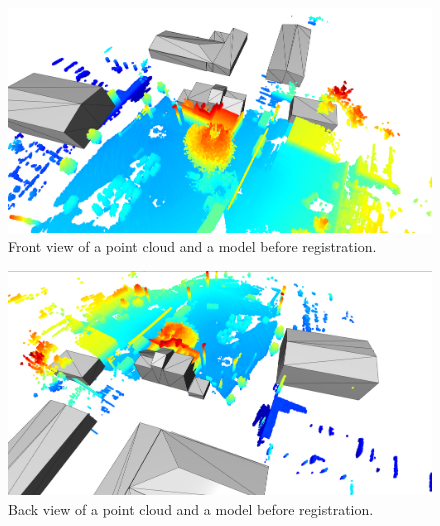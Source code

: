         \begin{figure}[H]
            \centering
            \includegraphics[scale=0.2]{images/solution_images/initial_front_model.png}
            \caption{Front view of a point cloud and a model before registration.}
            \label{fig:initial_front_model}
        \end{figure}
      
        \begin{figure}[H]
            \centering
            \includegraphics[scale=0.2]{images/solution_images/initial_back_model.png}
            \caption{Back view of a point cloud and a model before registration.}
            \label{fig:initial_back_model}
        \end{figure}
        
        


